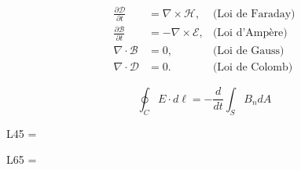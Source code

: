 \begin{equation}
    \label{eq:maxwell}
    \begin{aligned}
    \frac{\partial\mathcal{D}}{\partial t} & = \nabla\times\mathcal{H},   & \text{(Loi de Faraday)}\\
    \frac{\partial\mathcal{B}}{\partial t} & = -\nabla\times\mathcal{E},  & \text{(Loi d'Ampère)}\\
    \nabla\cdot\mathcal{B}                 & = 0,                         & \text{(Loi de Gauss)}\\
    \nabla\cdot\mathcal{D}                 & = 0.                         & \text{(Loi de Colomb)}
    \end{aligned}
\end{equation}

\[
    \oint_C {E \cdot d\ell = - \frac{d}{{dt}}} \int_S {B_n dA}
\]

L45 = \the\xlvchars\par
L65 = \the\lxvchars

\newpage
\layout

